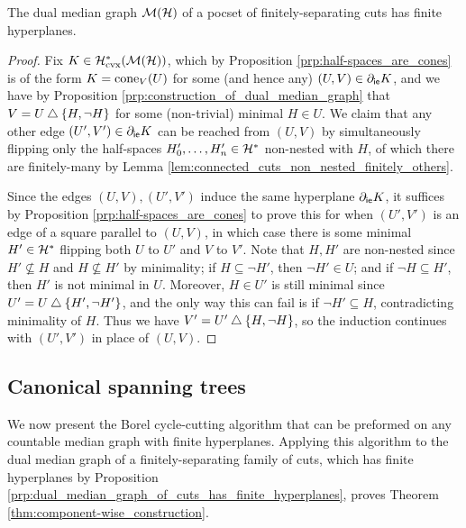 \documentclass[reqno]{amsart}
\begin{document}
    \begin{proposition}\label{prp:dual_median_graph_of_cuts_has_finite_hyperplanes}
        The dual median graph $\mathcal{M}(\mathcal{H})$ of a pocset of finitely-separating cuts has finite hyperplanes.
    \end{proposition}
    \begin{proof}
        Fix $K\in\mathcal{H}^\ast_\mathrm{cvx}(\mathcal{M}(\mathcal{H}))$, which by Proposition \ref{prp:half-spaces_are_cones} is of the form $K=\operatorname{cone}_V(U)$ for some (and hence any) $(U,V)\in\partial_\mathsf{ie}K$, and we have by Proposition \ref{prp:construction_of_dual_median_graph} that $V=U\bigtriangleup\left\{H,\lnot H\right\}$ for some (non-trivial) minimal $H\in U$. We claim that any other edge $(U',V')\in\partial_\mathsf{ie}K$ can be reached from $(U,V)$ by simultaneously flipping only the half-spaces $H'_0,\dots,H'_n\in\mathcal{H}^\ast$ non-nested with $H$, of which there are finitely-many by Lemma \ref{lem:connected_cuts_non_nested_finitely_others}.

        Since the edges $(U,V),(U',V')$ induce the same hyperplane $\partial_\mathsf{ie}K$, it suffices by Proposition \ref{prp:half-spaces_are_cones} to prove this for when $(U',V')$ is an edge of a square parallel to $(U,V)$, in which case there is some minimal $H'\in\mathcal{H}^\ast$ flipping both  $U$ to $U'$ and $V$ to $V'$. Note that $H,H'$ are non-nested since $H'\not\subseteq H$ and $H\not\subseteq H'$ by minimality; if $H\subseteq\lnot H'$, then $\lnot H'\in U$; and if $\lnot H\subseteq H'$, then $H'$ is not minimal in $U$. Moreover, $H\in U'$ is still minimal since $U'=U\bigtriangleup\left\{H',\lnot H'\right\}$, and the only way this can fail is if $\lnot H'\subseteq H$, contradicting minimality of $H$. Thus we have $V'=U'\bigtriangleup\left\{H,\lnot H\right\}$, so the induction continues with $(U',V')$ in place of $(U,V)$.
    \end{proof}

    \subsection{Canonical spanning trees}\label{sec:cycle_cutting_algorithm}

    We now present the Borel cycle-cutting algorithm that can be preformed on any countable median graph with finite hyperplanes. Applying this algorithm to the dual median graph of a finitely-separating family of cuts, which has finite hyperplanes by Proposition \ref{prp:dual_median_graph_of_cuts_has_finite_hyperplanes}, proves Theorem \ref{thm:component-wise_construction}.
\end{document}

